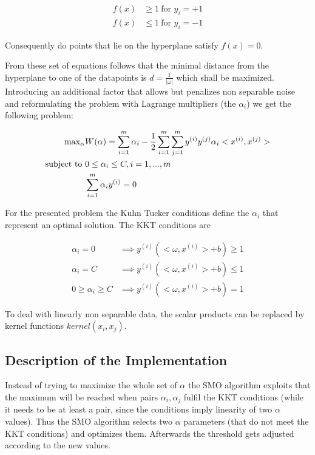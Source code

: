 \begin{align}
f(x) &\geq 1\ \text{for $y_i = +1$} \\
f(x) &\leq 1\ \text{for $y_i = -1$}
\end{align}

Consequently do points that lie on the hyperplane satisfy $f(x)=0$.

From these set of equations follows that the minimal distance from the hyperplane to one of the datapoints is $d=\frac{1}{|\omega|}$ which shall be maximized. Introducing an additional factor that allows but penalizes non separable noise and reformulating the problem with Lagrange multipliers (the $\alpha _i$) we get the following problem:

\begin{align}
\text{max}_\alpha& W(\alpha) = \sum_{i=1}^m \alpha _i - \frac{1}{2} \sum_{i=1}^m \sum_{j=1}^m y^{(i)} y^{(j)} \alpha _i <x^{(i)}, x^{(j)}> \\
\text{subject to \em} & 0\leq \alpha _i \leq C, i = 1,..., m \\
& \sum_{i=1}^m \alpha _i y^{(i)} = 0 \label{eq:sumalpha}
\end{align}

For the presented problem the Kuhn Tucker conditions define the $\alpha _i$ that represent an optimal solution. The KKT conditions are

\begin{align}
\alpha _i = 0 & \implies  y^{(i)}(<\omega, x^{(i)}> + b)  \geq 1 \\
\alpha _i = C & \implies  y^{(i)}(<\omega, x^{(i)}> + b)  \leq 1 \\
0 \geq \alpha _i \geq C & \implies  y^{(i)}(<\omega, x^{(i)}> + b)  = 1 \label{eq:alphabounds}
\end{align}

To deal with linearly non separable data, the scalar products can be replaced by kernel functions $kernel(x_i, x_j)$.

\subsection{Description of the Implementation}
Instead of trying to maximize the whole set of $\alpha$ the SMO algorithm exploits that the maximum will be reached when pairs $\alpha _i, \alpha _j$ fulfil the KKT conditions (while it needs to be at least a pair, since the conditions imply linearity of two $\alpha$ values). Thus the SMO algorithm selects two $\alpha$ parameters (that do not meet the KKT conditions) and optimizes them. Afterwards the threshold gets adjusted according to the new values.

